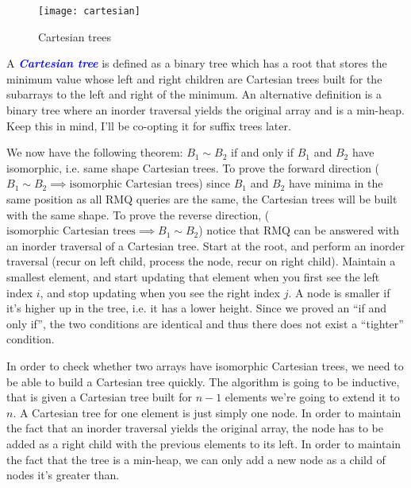 \documentclass[11pt, oneside]{article}
\newcommand{\emphasis}[1]{\textcolor{blue}{\textbf{\textit{#1}}}}
\begin{document}
\begin{figure}[h!]
\centering
\texttt{[image: cartesian]}
\caption{Cartesian trees}
\end{figure}

A \emphasis{Cartesian tree} is defined as a binary tree which has a root that stores the minimum value
whose left and right children are Cartesian trees built for the subarrays to the left
and right of the minimum. An alternative definition is a binary tree where an inorder traversal yields the original array
and is a min-heap. Keep this in mind, I'll be co-opting it for suffix trees later.

We now have the following theorem: \( B_1 \sim B_2 \) if and only if \( B_1 \) and \( B_2 \)
have isomorphic, i.e. same shape Cartesian trees. To prove the forward direction
(\( B_1 \sim B_2 \implies \text{isomorphic Cartesian trees}\)) since \( B_1 \) and \( B_2 \)
have minima in the same position as all RMQ queries are the same, the Cartesian trees will be
built with the same shape. To prove the reverse direction, (\( \text{isomorphic Cartesian trees} \implies B_1 \sim B_2 \))
notice that RMQ can be answered with an inorder traversal of a Cartesian tree. Start at the root,
and perform an inorder traversal (recur on left child, process the node, recur on right child).
Maintain a smallest element, and start updating that element when you first see the left index \( i \),
and stop updating when you see the right index \( j \). A node is smaller if it's higher up in the tree, i.e.
it has a lower height. Since we proved an ``if and only if'', the two conditions
are identical and thus there does not exist a ``tighter'' condition.

In order to check whether two arrays have isomorphic Cartesian trees, we need to be able to
build a Cartesian tree quickly. The algorithm is going to be inductive, that is
given a Cartesian tree built for \( n - 1 \) elements we're going to extend it to \( n \).
A Cartesian tree for one element is just simply one node.
In order to maintain the fact that an inorder traversal yields the original array,
the node has to be added as a right child with the previous elements to its left.
In order to maintain the fact that the tree is a min-heap,
we can only add a new node as a child of nodes it's greater than.
\end{document}

